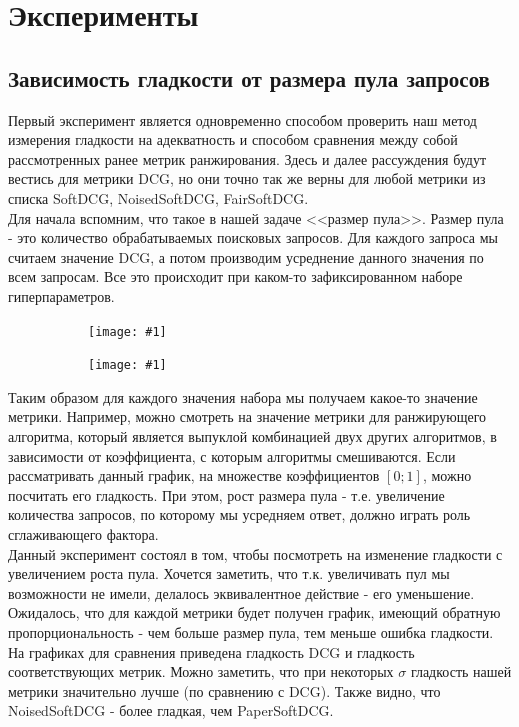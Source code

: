 \documentclass[14pt,a4paper]{amsart}
\theoremstyle{definition}
\theoremstyle{definition}
\newcommand{\incpic}[1]{
\begin{figure}[!h]
    \centering
    \begin{subfigure}{\textwidth}
    \centering
        \texttt{[image: \#1]}
    \end{subfigure}
\end{figure}
}
\begin{document}
\newpage
\section{Эксперименты}

\subsection{Зависимость гладкости от размера пула запросов}

Первый эксперимент является одновременно способом проверить наш метод измерения гладкости на адекватность и способом сравнения между собой рассмотренных ранее метрик ранжирования. Здесь и далее рассуждения будут вестись для метрики DCG, но они точно так же верны для любой метрики из списка SoftDCG, NoisedSoftDCG, FairSoftDCG.\\

Для начала вспомним, что такое в нашей задаче <<размер пула>>. Размер пула - это количество обрабатываемых поисковых запросов. Для каждого запроса мы считаем значение DCG, а потом производим усреднение данного значения по всем запросам. Все это происходит при каком-то зафиксированном наборе гиперпараметров.\\

\incpic{paper_decrease_smoothness}
\incpic{noised_decrease_smoothness}

Таким образом для каждого значения набора мы получаем какое-то значение метрики. Например, можно смотреть на значение метрики для ранжирующего алгоритма, который является выпуклой комбинацией двух других алгоритмов, в зависимости от коэффициента, с которым алгоритмы смешиваются. Если рассматривать данный график, на множестве коэффициентов $[0;1]$, можно посчитать его гладкость. При этом, рост размера пула - т.е. увеличение количества запросов, по которому мы усредняем ответ, должно играть роль сглаживающего фактора. \\

Данный эксперимент состоял в том, чтобы посмотреть на изменение гладкости с увеличением роста пула. Хочется заметить, что т.к. увеличивать пул мы возможности не имели, делалось эквивалентное действие - его уменьшение. Ожидалось, что для каждой метрики будет получен график, имеющий обратную пропорциональность - чем больше размер пула, тем меньше ошибка гладкости.\\

На графиках для сравнения приведена гладкость DCG и гладкость соответствующих метрик. Можно заметить, что при некоторых $\sigma$ гладкость нашей метрики значительно лучше (по сравнению с DCG). Также видно, что NoisedSoftDCG - более гладкая, чем PaperSoftDCG.\\
\end{document}
